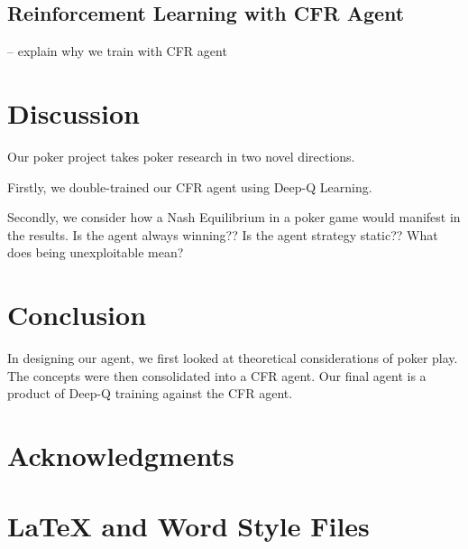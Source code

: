 \documentclass{article}
\begin{document}
\subsection{Reinforcement Learning with CFR Agent}

-- explain why we train with CFR agent

\section{Discussion}
Our poker project takes poker research in two novel directions.

Firstly, we double-trained our CFR agent using Deep-Q Learning.

Secondly, we consider how a Nash Equilibrium in a poker game would manifest in the results. Is the agent always winning?? Is the agent strategy static?? What does being unexploitable mean?

\section{Conclusion}

In designing our agent, we first looked at theoretical considerations of poker play. The concepts were then consolidated into a CFR agent. Our final agent is a product of Deep-Q training against the CFR agent.

\section{Acknowledgments}

\appendix

\section{\LaTeX{} and Word Style Files}\label{stylefiles}



\end{document}

